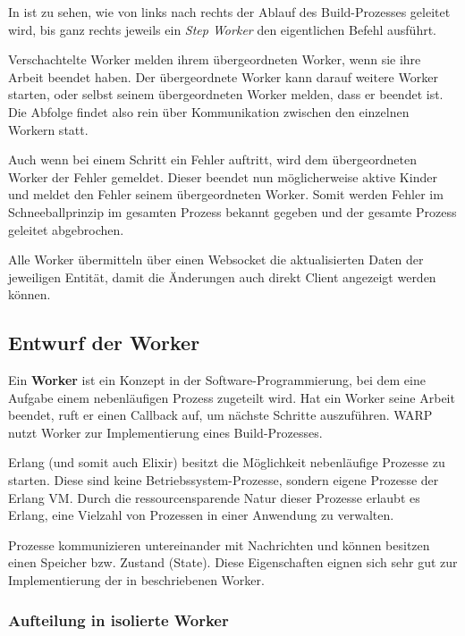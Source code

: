 In  ist zu sehen, wie von links nach rechts der Ablauf des Build-Prozesses geleitet wird, bis ganz rechts jeweils ein \emph{Step Worker} den eigentlichen Befehl ausführt.

Verschachtelte Worker melden ihrem übergeordneten Worker, wenn sie ihre Arbeit beendet haben. Der übergeordnete Worker kann darauf weitere Worker starten, oder selbst seinem übergeordneten Worker melden, dass er beendet ist. Die Abfolge findet also rein über Kommunikation zwischen den einzelnen Workern statt.

Auch wenn bei einem Schritt ein Fehler auftritt, wird dem übergeordneten Worker der Fehler gemeldet. Dieser beendet nun möglicherweise aktive Kinder und meldet den Fehler seinem übergeordneten Worker. Somit werden Fehler im Schneeballprinzip im gesamten Prozess bekannt gegeben und der gesamte Prozess geleitet abgebrochen.

Alle Worker übermitteln über einen Websocket die aktualisierten Daten der jeweiligen Entität, damit die Änderungen auch direkt Client angezeigt werden können.

\subsection{Entwurf der Worker}

Ein \textbf{Worker} ist ein Konzept in der Software-Programmierung, bei dem eine Aufgabe einem nebenläufigen Prozess zugeteilt wird. Hat ein Worker seine Arbeit beendet, ruft er einen Callback auf, um nächste Schritte auszuführen. WARP nutzt Worker zur Implementierung eines Build-Prozesses.

Erlang (und somit auch Elixir) besitzt die Möglichkeit nebenläufige Prozesse zu starten. Diese sind keine Betriebssystem-Prozesse, sondern eigene Prozesse der Erlang VM. Durch die ressourcensparende Natur dieser Prozesse erlaubt es Erlang, eine Vielzahl von Prozessen in einer Anwendung zu verwalten. \citep[133]{Armstrong2007}

Prozesse kommunizieren untereinander mit Nachrichten und können besitzen einen Speicher bzw. Zustand (State). Diese Eigenschaften eignen sich sehr gut zur Implementierung der in  beschriebenen Worker.

\subsubsection{Aufteilung in isolierte Worker}
\label{subsec:aufteilung-der-worker}

